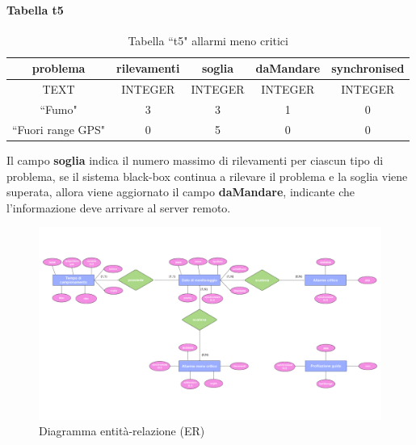 \documentclass[12pt, a4paper, italian]{report}
\numberwithin{figure}{chapter}
\numberwithin{table}{chapter}
\begin{document}
\paragraph{Tabella t5}
\begin{table}[h!]
  \centering 
  \begin{adjustbox}{max width=\textwidth}
    \begin{tabular}{|c|c|c|c|c|}
      \hline
      \textbf{problema} & \textbf{rilevamenti} & \textbf{soglia} & \textbf{daMandare} & \textbf{synchronised} \\
      \hline
      TEXT & INTEGER & INTEGER & INTEGER & INTEGER \\
      \hline
      ``Fumo" & 3 & 3 & 1 & 0 \\
      \hline
      ``Fuori range GPS" & 0 & 5 & 0 & 0 \\
      \hline
    \end{tabular}
  \end{adjustbox}
  \caption{Tabella ``t5" allarmi meno critici}
  \label{tab:t5 allarmi meno critici}
\end{table}
Il campo \textbf{soglia} indica il numero massimo di rilevamenti per ciascun tipo di problema, se il sistema black-box continua a rilevare il problema e la soglia viene superata, allora viene aggiornato il campo \textbf{daMandare}, indicante che l'informazione deve arrivare al server remoto.

\newpage

\begin{figure}[h]
  \centering
  \includegraphics[width=15cm]{diagrammaER.png}
  \caption{Diagramma entità-relazione (ER)}
  \label{fig:diagrammaER}
\end{figure}

\newpage
\end{document}

